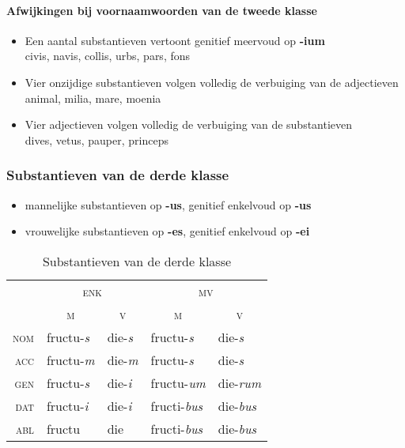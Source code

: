 \documentclass[12pt,a4paper]{article}
\begin{document}
\paragraph{Afwijkingen bij voornaamwoorden van de tweede klasse}
\begin{itemize}
    \item Een aantal substantieven vertoont genitief meervoud op \textbf{-ium} \\
        civis, navis, collis, urbs, pars, fons
    \item Vier onzijdige substantieven volgen volledig de verbuiging van de adjectieven \\
        animal, milia, mare, moenia
    \item Vier adjectieven volgen volledig de verbuiging van de substantieven \\
        dives, vetus, pauper, princeps
\end{itemize}

\subsubsection{Substantieven van de derde klasse}
\begin{itemize}
    \item mannelijke substantieven op \textbf{-us}, genitief enkelvoud op \textbf{-us}
    \item vrouwelijke substantieven op \textbf{-es}, genitief enkelvoud op \textbf{-ei}
\end{itemize}

\begin{table}[H]
\centering
\begin{tabular}{ r | l l | l l }
\toprule
 & \multicolumn{2}{c|}{\textsc{enk}} & \multicolumn{2}{c}{\textsc{mv}} \\
 & \multicolumn{1}{c}{\textsc{m}} & \multicolumn{1}{c|}{\textsc{v}} & \multicolumn{1}{c}{\textsc{m}} & \multicolumn{1}{c}{\textsc{v}} \\ 
\midrule
\textsc{nom} & fructu-\emph{s} & die-\emph{s} & fructu-\emph{s}   & die-\emph{s}   \\
\textsc{acc} & fructu-\emph{m} & die-\emph{m} & fructu-\emph{s}   & die-\emph{s}   \\
\textsc{gen} & fructu-\emph{s} & die-\emph{i} & fructu-\emph{um}  & die-\emph{rum} \\
\textsc{dat} & fructu-\emph{i} & die-\emph{i} & fructi-\emph{bus} & die-\emph{bus} \\
\textsc{abl} & fructu          & die          & fructi-\emph{bus} & die-\emph{bus} \\
\bottomrule
\end{tabular}
\caption{Substantieven van de derde klasse}
\label{tab:subst3}
\end{table}
\end{document}
